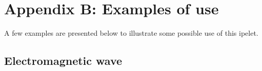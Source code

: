 \documentclass[11pt,a4paper]{article}
\begin{document}


\clearpage
\section*{Appendix B: Examples of use}

A few examples are presented below to illustrate some possible use of this ipelet.

\subsection{Electromagnetic wave}
\end{document}
